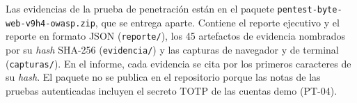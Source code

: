 \documentclass[stu,12pt,floatsintext]{apa7}
\newcommand{\ruta}[1]{{\urlstyle{tt}\nolinkurl{#1}}}
\begin{document}
Las evidencias de la prueba de penetración están en el paquete \ruta{pentest-byte-web-v9h4-owasp.zip},
que se entrega aparte. Contiene el reporte ejecutivo y el reporte en formato JSON (\ruta{reporte/}), los
45 artefactos de evidencia nombrados por su \textit{hash} SHA-256 (\ruta{evidencia/}) y las capturas de
navegador y de terminal (\ruta{capturas/}). En el informe, cada evidencia se cita por los primeros
caracteres de su \textit{hash}. El paquete no se publica en el repositorio porque las notas de las
pruebas autenticadas incluyen el secreto TOTP de las cuentas demo (PT-04).
\end{document}
